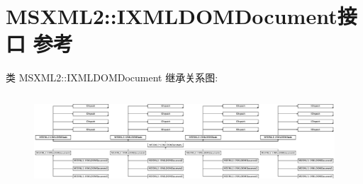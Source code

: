 \hypertarget{interface_m_s_x_m_l2_1_1_i_x_m_l_d_o_m_document}{}\section{M\+S\+X\+M\+L2\+:\+:I\+X\+M\+L\+D\+O\+M\+Document接口 参考}
\label{interface_m_s_x_m_l2_1_1_i_x_m_l_d_o_m_document}
类 M\+S\+X\+M\+L2\+:\+:I\+X\+M\+L\+D\+O\+M\+Document 继承关系图\+:\begin{figure}[H]
\begin{center}
\leavevmode
\includegraphics[height=3.465346cm]{interface_m_s_x_m_l2_1_1_i_x_m_l_d_o_m_document}
\end{center}
\end{figure}
